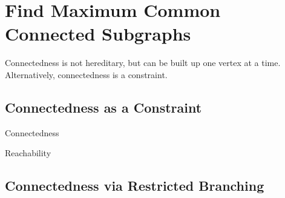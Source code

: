 \documentclass{llncs}
\begin{document}
\section{Find Maximum Common Connected Subgraphs}

Connectedness is not hereditary, but can be built up one vertex at a time. Alternatively,
connectedness is a constraint.

\subsection{Connectedness as a Constraint}

Connectedness \cite{Brown:2005}

Reachability \cite{DBLP:conf/cp/DoomsDD05,DBLP:conf/cp/QuesadaRD05}

\subsection{Connectedness via Restricted Branching}
\end{document}
